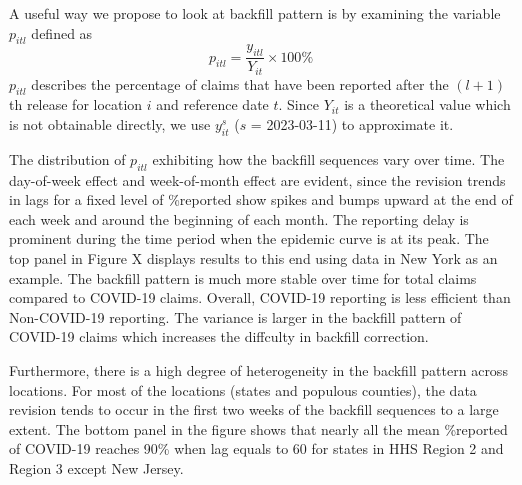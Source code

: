 A useful way we propose to look at backfill pattern is by examining the variable $p_{itl}$ defined as $$p_{itl} = \frac{y_{itl}}{Y_{it}} \times 100\%$$
$p_{itl}$ describes the percentage of claims that have been reported after the $(l+1)$th release for location $i$ and reference date $t$. Since $Y_{it}$ is a theoretical value which is not obtainable directly, we use $y_{it}^s$ ($s$ = 2023-03-11) to approximate it. 

The distribution of $p_{itl}$ exhibiting how the backfill sequences vary over time. The day-of-week effect and week-of-month effect are evident, since the revision trends in lags for a fixed level of \%reported show spikes and bumps upward at the end of each week and around the beginning of each month. The reporting delay is prominent during the time period when the epidemic curve is at its peak. The top panel in Figure X displays results to this end using data in New York as an example. The backfill pattern is much more stable over time for total claims compared to COVID-19 claims. Overall, COVID-19 reporting is less efficient than Non-COVID-19 reporting. The variance is larger in the backfill pattern of COVID-19 claims which increases the diffculty in backfill correction. 

Furthermore, there is a high degree of heterogeneity in the backfill pattern across locations. For most of the locations (states and populous counties), the data revision tends to occur in the first two weeks of the backfill sequences to a large extent. The bottom panel in the figure shows that nearly all the mean \%reported of COVID-19 reaches 90\% when lag equals to 60 for states in HHS Region 2 and Region 3 except New Jersey. 



